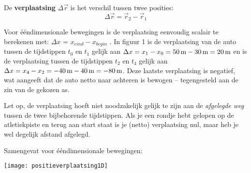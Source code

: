\documentclass{ximera}
\begin{document}
\begin{definition}
De \textbf{verplaatsing} \(\Delta \vec{r}\) is het verschil tussen twee posities:
\[
\Delta \vec{r} = \vec{r}_2 - \vec{r}_1
\]


\begin{image}
\end{image}
\end{definition}

Voor ééndimensionale bewegingen is de verplaatsing eenvoudig scalair te berekenen met: $\Delta x$ = $x_{eind}-x_{begin}$ .
In figuur 1 is de verplaatsing van de auto tussen de tijdstippen $t_0$ en $t_1$ gelijk aan $\Delta x = x_1-x_0=50\rm\,m-30\rm\,m=20\rm\,m$ en is de verplaatsing tussen de tijdstippen $t_2$ en $t_4$ gelijk aan $\Delta x=x_4-x_2=-40\rm\,m-40\rm\,m=-80\rm\,m$. Deze laatste verplaatsing is negatief, wat aangeeft dat de auto netto naar achteren is bewogen -- tegengesteld aan de zin van de gekozen as.

Let op, de verplaatsing hoeft niet noodzakelijk gelijk te zijn aan de \emph{afgelegde weg} tussen de twee bijbehorende tijdstippen. Als je een rondje hebt gelopen op de atletiekpiste en terug aan start staat is je (netto) verplaatsing nul, maar heb je wel degelijk afstand afgelegd.

Samengevat voor ééndimensionale bewegingen:

\begin{image}
\texttt{[image: positieverplaatsing1D]}

\end{image}
\end{document}
